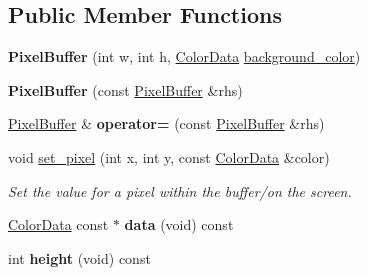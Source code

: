 \subsection*{Public Member Functions}
\begin{DoxyCompactItemize}
\item 
{\bfseries Pixel\+Buffer} (int w, int h, \hyperlink{classimage__tools_1_1ColorData}{Color\+Data} \hyperlink{classimage__tools_1_1PixelBuffer_a23e28a411f6e6d553f67b9a7c4a8a33d}{background\+\_\+color})\hypertarget{classimage__tools_1_1PixelBuffer_a4f5b5df93389946d70bc001acfebcedb}{}\label{classimage__tools_1_1PixelBuffer_a4f5b5df93389946d70bc001acfebcedb}

\item 
{\bfseries Pixel\+Buffer} (const \hyperlink{classimage__tools_1_1PixelBuffer}{Pixel\+Buffer} \&rhs)\hypertarget{classimage__tools_1_1PixelBuffer_a25b0c7d5686807d187ee799a5fbb1121}{}\label{classimage__tools_1_1PixelBuffer_a25b0c7d5686807d187ee799a5fbb1121}

\item 
\hyperlink{classimage__tools_1_1PixelBuffer}{Pixel\+Buffer} \& {\bfseries operator=} (const \hyperlink{classimage__tools_1_1PixelBuffer}{Pixel\+Buffer} \&rhs)\hypertarget{classimage__tools_1_1PixelBuffer_a95f63d0b72c4d0b371c556597cf77578}{}\label{classimage__tools_1_1PixelBuffer_a95f63d0b72c4d0b371c556597cf77578}

\item 
void \hyperlink{classimage__tools_1_1PixelBuffer_ac3559133504c49f3af9a00544411c3b8}{set\+\_\+pixel} (int x, int y, const \hyperlink{classimage__tools_1_1ColorData}{Color\+Data} \&color)\hypertarget{classimage__tools_1_1PixelBuffer_ac3559133504c49f3af9a00544411c3b8}{}\label{classimage__tools_1_1PixelBuffer_ac3559133504c49f3af9a00544411c3b8}

\begin{DoxyCompactList}\small\item\em Set the value for a pixel within the buffer/on the screen. \end{DoxyCompactList}\item 
\hyperlink{classimage__tools_1_1ColorData}{Color\+Data} const $\ast$ {\bfseries data} (void) const \hypertarget{classimage__tools_1_1PixelBuffer_a2450a6c464bbe620d9efec2ac6c82a9e}{}\label{classimage__tools_1_1PixelBuffer_a2450a6c464bbe620d9efec2ac6c82a9e}

\item 
int {\bfseries height} (void) const \hypertarget{classimage__tools_1_1PixelBuffer_a37fa2f4abc4c1d28a063c3c74b1faf9d}{}\label{classimage__tools_1_1PixelBuffer_a37fa2f4abc4c1d28a063c3c74b1faf9d}


\end{DoxyCompactItemize}
